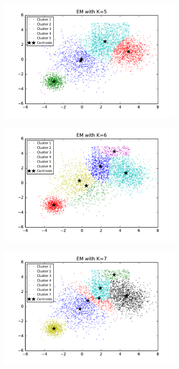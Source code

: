 \begin{figure}[htb]
\begin{subfigure}[b]{0.475\textwidth}
            \includegraphics[width=\textwidth]{./figures/bigClustering_EM_5.pdf}
        \end{subfigure}
        \hfill
        \begin{subfigure}[b]{0.475\textwidth}   
            \centering 
            \includegraphics[width=\textwidth]{./figures/bigClustering_EM_6.pdf}
        \end{subfigure}
        \begin{subfigure}[b]{0.475\textwidth}   
            \centering 
            \includegraphics[width=\textwidth]{./figures/bigClustering_EM_7.pdf}

\end{subfigure}
\end{figure}
